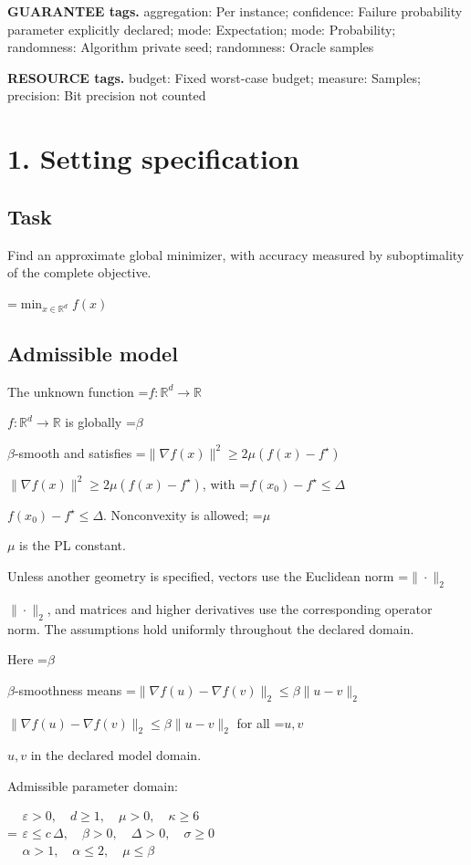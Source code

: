 \documentclass[10pt,a4paper]{article}
\newcommand{\AtlasMath}[1]{\par\begingroup\centering\setbox0=\hbox{$\displaystyle #1$}\ifdim\wd0>1.4\linewidth\typeout{ATLAS WIDE FORMULA: \the\wd0}\fi\ifdim\wd0>\linewidth\resizebox{\linewidth}{!}{\box0}\else\box0\fi\par\endgroup}
\newcommand{\AtlasInlineMath}[1]{\begingroup\setbox0=\hbox{$#1$}\ifdim\wd0>.4\linewidth\endgroup\AtlasMath{#1}\else\endgroup$#1$\fi}
\begin{document}
\textbf{GUARANTEE tags.} aggregation: Per instance; confidence: Failure probability parameter explicitly declared; mode: Expectation; mode: Probability; randomness: Algorithm private seed; randomness: Oracle samples



\textbf{RESOURCE tags.} budget: Fixed worst-case budget; measure: Samples; precision: Bit precision not counted



\section{1. Setting specification}


\subsection{Task}


Find an approximate global minimizer, with accuracy measured by suboptimality of the complete objective.




\AtlasMath{\min_{x\in \mathbb{R}^d}f(x)}




\subsection{Admissible model}


The unknown function \AtlasInlineMath{f:\mathbb R^d\to\mathbb R} is globally \AtlasInlineMath{\beta}-smooth and satisfies \AtlasInlineMath{\|\nabla f(x)\|^2\ge2\mu(f(x)-f^\star)}, with \AtlasInlineMath{f(x_0)-f^\star\le\Delta}. Nonconvexity is allowed; \AtlasInlineMath{\mu} is the PL constant.



Unless another geometry is specified, vectors use the Euclidean norm \AtlasInlineMath{\|\cdot\|_2}, and matrices and higher derivatives use the corresponding operator norm. The assumptions hold uniformly throughout the declared domain.



Here \AtlasInlineMath{\beta}-smoothness means \AtlasInlineMath{\|\nabla f(u)-\nabla f(v)\|_2\le\beta\|u-v\|_2} for all \AtlasInlineMath{u,v} in the declared model domain.



Admissible parameter domain:


\AtlasMath{\begin{gathered}\varepsilon > 0,\quad d \ge 1,\quad \mu > 0,\quad \kappa \ge 6\\\varepsilon \le c\,\Delta,\quad \beta > 0,\quad \Delta > 0,\quad \sigma \ge 0\\\alpha > 1,\quad \alpha \le 2,\quad \mu \le \beta\end{gathered}}
\end{document}

